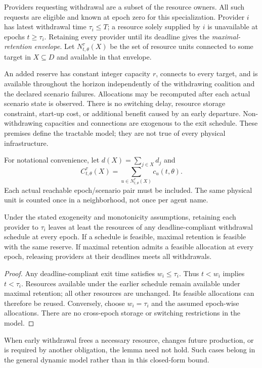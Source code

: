 Providers requesting withdrawal are a subset of the resource owners. All such requests are eligible and known at epoch zero for this specialization. Provider $i$ has latest withdrawal time $\tau_i\leq T$; a resource solely supplied by $i$ is unavailable at epochs $t\geq\tau_i$. Retaining every provider until its deadline gives the \emph{maximal-retention envelope}. Let $N_{t,\theta}^{\tau}(X)$ be the set of resource units connected to some target in $X\subseteq D$ and available in that envelope.

An added reserve has constant integer capacity $r$, connects to every target, and is available throughout the horizon independently of the withdrawing coalition and the declared scenario failures. Allocations may be recomputed after each actual scenario state is observed. There is no switching delay, resource storage constraint, start-up cost, or additional benefit caused by an early departure. Non-withdrawing capacities and connections are exogenous to the exit schedule. These premises define the tractable model; they are not true of every physical infrastructure.

For notational convenience, let $d(X)=\sum_{j\in X}d_j$ and
\begin{equation}
C^{\tau}_{t,\theta}(X)=\sum_{u\in N_{t,\theta}^{\tau}(X)}c_u(t,\theta).
\end{equation}
Each actual reachable epoch/scenario pair must be included. The same physical unit is counted once in a neighborhood, not once per agent name.

\begin{lemma}
Under the stated exogeneity and monotonicity assumptions, retaining each provider to $\tau_i$ leaves at least the resources of any deadline-compliant withdrawal schedule at every epoch. If a schedule is feasible, maximal retention is feasible with the same reserve. If maximal retention admits a feasible allocation at every epoch, releasing providers at their deadlines meets all withdrawals.
\end{lemma}
\begin{proof}
Any deadline-compliant exit time satisfies $w_i\leq\tau_i$. Thus $t<w_i$ implies $t<\tau_i$. Resources available under the earlier schedule remain available under maximal retention; all other resources are unchanged. Its feasible allocations can therefore be reused. Conversely, choose $w_i=\tau_i$ and the assumed epoch-wise allocations. There are no cross-epoch storage or switching restrictions in the model.
\end{proof}
When early withdrawal frees a necessary resource, changes future production, or is required by another obligation, the lemma need not hold. Such cases belong in the general dynamic model rather than in this closed-form bound.

